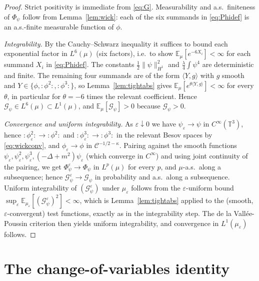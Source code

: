 \documentclass[12pt]{article}
\theoremstyle{definition}
\newcommand{\T}{\mathbb{T}^3}
\newcommand{\E}{\mathbb{E}}
\newcommand{\Wick}[1]{{:}#1{:}}
\begin{document}
\begin{proof}
Strict positivity is immediate from \eqref{eq:G}. Measurability and a.s.\ finiteness of
$\Phi_\psi$ follow from Lemma~\ref{lem:wick}: each of the six summands in
\eqref{eq:Phidef} is an a.s.-finite measurable function of $\phi$.

\emph{Integrability.} By the Cauchy--Schwarz inequality it suffices to bound each
exponential factor in $L^6(\mu)$ (six factors), i.e.\ to show
$\E_\mu[e^{-6 X_i}]<\infty$ for each summand $X_i$ in \eqref{eq:Phidef}. The constants
$\tfrac12\|\psi\|_{H^1}^2$ and $\tfrac\lambda4\int\psi^4$ are deterministic and finite.
The remaining four summands are of the form $\langle Y,g\rangle$ with $g$ smooth and
$Y\in\{\phi,\Wick{\phi^2},\Wick{\phi^3}\}$, so Lemma~\ref{lem:tightabs} gives
$\E_\mu[e^{\theta\langle Y,g\rangle}]<\infty$ for every $\theta$, in particular for
$\theta=-6$ times the relevant coefficient. Hence $\mathcal G_\psi\in L^6(\mu)\subset
L^1(\mu)$, and $\E_\mu[\mathcal G_\psi]>0$ because $\mathcal G_\psi>0$.

\emph{Convergence and uniform integrability.} As $\varepsilon\downarrow0$ we have
$\psi_\varepsilon\to\psi$ in $C^\infty(\T)$, hence $\Wick{\phi_\varepsilon^2}\to\Wick{\phi^2}$
and $\Wick{\phi_\varepsilon^3}\to\Wick{\phi^3}$ in the relevant Besov spaces by
\eqref{eq:wickconv}, and $\phi_\varepsilon\to\phi$ in $\mathcal C^{-1/2-\kappa}$.
Pairing against the smooth functions $\psi_\varepsilon,\psi_\varepsilon^2,\psi_\varepsilon^3,(-\Delta+m^2)\psi_\varepsilon$
(which converge in $C^\infty$) and using joint continuity of the pairing, we get
$\Phi_\psi^\varepsilon\to\Phi_\psi$ in $L^p(\mu)$ for every $p$, and $\mu$-a.s.\ along a
subsequence; hence $\mathcal G_\psi^\varepsilon\to\mathcal G_\psi$ in probability and
a.s.\ along a subsequence. Uniform integrability of
$(\mathcal G_\psi^\varepsilon)$ under $\mu_\varepsilon$ follows from the
$\varepsilon$-uniform bound $\sup_\varepsilon\E_{\mu_\varepsilon}[(\mathcal G_\psi^\varepsilon)^2]<\infty$,
which is Lemma~\ref{lem:tightabs} applied to the (smooth, $\varepsilon$-convergent)
test functions, exactly as in the integrability step. The de la Vall\'ee-Poussin
criterion then yields uniform integrability, and convergence in $L^1(\mu_\varepsilon)$
follows.
\end{proof}

\section{The change-of-variables identity}\label{sec:identity}
\end{document}
